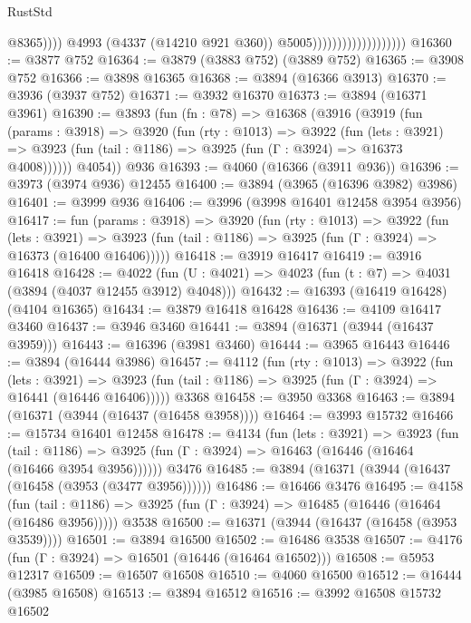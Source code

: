 \begin{lexlean}{RustStd}
\begin{coremodule}
                                                  @8365))))
                                          @4993
                                          (@4337 (@14210 @921 @360))
                                          @5005)))))))))))))))))))
@16360 := @3877 @752
@16364 := @3879 (@3883 @752) (@3889 @752)
@16365 := @3908 @752
@16366 := @3898 @16365
@16368 := @3894 (@16366 @3913)
@16370 := @3936 (@3937 @752)
@16371 := @3932 @16370
@16373 := @3894 (@16371 @3961)
@16390 := @3893
    (fun (fn : @78) =>
    @16368
      (@3916
        (@3919
          (fun (params : @3918) =>
          @3920
            (fun (rty : @1013) =>
            @3922
              (fun (lets : @3921) =>
              @3923 (fun (tail : @1186) => @3925 (fun (Γ : @3924) => @16373 @4008))))))
        @4054))
    @936
@16393 := @4060 (@16366 (@3911 @936))
@16396 := @3973 (@3974 @936) @12455
@16400 := @3894 (@3965 (@16396 @3982) @3986)
@16401 := @3999 @936
@16406 := @3996 (@3998 @16401 @12458 @3954 @3956)
@16417 := fun (params : @3918) =>
  @3920
    (fun (rty : @1013) =>
    @3922
      (fun (lets : @3921) =>
      @3923 (fun (tail : @1186) => @3925 (fun (Γ : @3924) => @16373 (@16400 @16406)))))
@16418 := @3919 @16417
@16419 := @3916 @16418
@16428 := @4022
    (fun (U : @4021) => @4023 (fun (t : @7) => @4031 (@3894 (@4037 @12455 @3912) @4048)))
@16432 := @16393 (@16419 @16428) (@4104 @16365)
@16434 := @3879 @16418 @16428
@16436 := @4109 @16417 @3460
@16437 := @3946 @3460
@16441 := @3894 (@16371 (@3944 (@16437 @3959)))
@16443 := @16396 (@3981 @3460)
@16444 := @3965 @16443
@16446 := @3894 (@16444 @3986)
@16457 := @4112
    (fun (rty : @1013) =>
    @3922
      (fun (lets : @3921) =>
      @3923 (fun (tail : @1186) => @3925 (fun (Γ : @3924) => @16441 (@16446 @16406)))))
    @3368
@16458 := @3950 @3368
@16463 := @3894 (@16371 (@3944 (@16437 (@16458 @3958))))
@16464 := @3993 @15732
@16466 := @15734 @16401 @12458
@16478 := @4134
    (fun (lets : @3921) =>
    @3923
      (fun (tail : @1186) =>
      @3925 (fun (Γ : @3924) => @16463 (@16446 (@16464 (@16466 @3954 @3956))))))
    @3476
@16485 := @3894 (@16371 (@3944 (@16437 (@16458 (@3953 (@3477 @3956))))))
@16486 := @16466 @3476
@16495 := @4158
    (fun (tail : @1186) => @3925 (fun (Γ : @3924) => @16485 (@16446 (@16464 (@16486 @3956)))))
    @3538
@16500 := @16371 (@3944 (@16437 (@16458 (@3953 @3539))))
@16501 := @3894 @16500
@16502 := @16486 @3538
@16507 := @4176 (fun (Γ : @3924) => @16501 (@16446 (@16464 @16502)))
@16508 := @5953 @12317
@16509 := @16507 @16508
@16510 := @4060 @16500
@16512 := @16444 (@3985 @16508)
@16513 := @3894 @16512
@16516 := @3992 @16508 @15732 @16502

\end{coremodule}
\end{lexlean}
